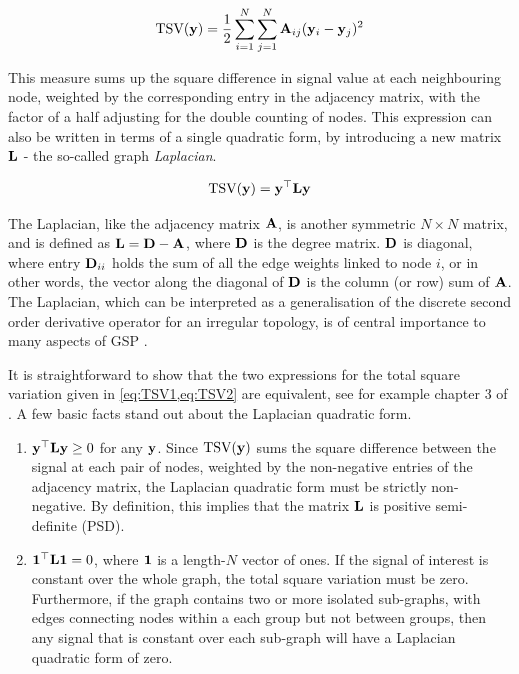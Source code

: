 \begin{equation}
    \label{eq:TSV1}
    \text{TSV}(\mathbf{y}) = \frac{1}{2}\sum_{i=1}^N \sum_{j=1}^N \mathbf{A}_{ij} (\mathbf{y}_i - \mathbf{y}_j)^2
\end{equation}

This measure sums up the square difference in signal value at each neighbouring node, weighted by the corresponding entry in the adjacency matrix, with the factor of a half adjusting for the double counting of nodes. This expression can also be written in terms of a single quadratic form, by introducing a new matrix $\mathbf{L}$ - the so-called graph \textit{Laplacian}. 

\begin{equation}
    \label{eq:TSV2}
    \text{TSV}(\mathbf{y}) = \mathbf{y}^\top \mathbf{L} \mathbf{y}
\end{equation}

The Laplacian, like the adjacency matrix $\mathbf{A}$, is another symmetric $N \times N$ matrix, and is defined as $\mathbf{L} = \mathbf{D} - \mathbf{A}$, where $\mathbf{D}$ is the degree matrix. $\mathbf{D}$ is diagonal, where entry $\mathbf{D}_{ii}$ holds the sum of all the edge weights linked to node $i$, or in other words, the vector along the diagonal of $\mathbf{D}$ is the column (or row) sum of $\mathbf{A}$. The Laplacian, which can be interpreted as a generalisation of the discrete second order derivative operator for an irregular topology, is of central importance to many aspects of GSP \citep{Shuman2013}. 

\newpage

It is straightforward to show that the two expressions for the total square variation given in \cref{eq:TSV1,eq:TSV2} are equivalent, see for example chapter 3 of \cite{Ortega2022}. A few basic facts stand out about the Laplacian quadratic form.

\begin{enumerate}
    \item $\mathbf{y}^\top \mathbf{L} \mathbf{y} \geq 0$ for any $\mathbf{y}$. Since $\text{TSV}(\mathbf{y})$ sums the square difference between the signal at each pair of nodes, weighted by the non-negative entries of the adjacency matrix, the Laplacian quadratic form must be strictly non-negative. By definition, this implies that the matrix $\mathbf{L}$ is positive semi-definite (PSD). 
    \item $\mathbf{1}^\top \mathbf{L} \mathbf{1} = 0$, where $\mathbf{1}$ is a length-$N$ vector of ones. If the signal of interest is constant over the whole graph, the total square variation must be zero. Furthermore, if the graph contains two or more isolated sub-graphs, with edges connecting nodes within a each group but not between groups, then any signal that is constant over each sub-graph will have a Laplacian quadratic form of zero. 
\end{enumerate}

